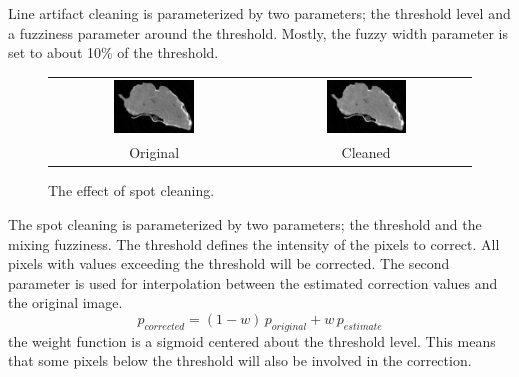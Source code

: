 \documentclass[a4paper]{scrreprt}
\begin{document}
Line artifact cleaning is parameterized by two parameters; the threshold level and a fuzziness parameter around the threshold. Mostly, the fuzzy width parameter is set to about 10\% of the threshold.
\begin{figure}[ht!]
\centering
\begin{tabular}{cc}
\includegraphics[width=0.4\textwidth]{figures/lineartifact_raw.png}&
\includegraphics[width=0.4\textwidth]{figures/lineartifact_clean.png}\\
Original & Cleaned
\end{tabular}
\caption{The effect of spot cleaning.}\label{fig_spotcleaning}
\end{figure}

The spot cleaning is parameterized by two parameters; the threshold and the mixing fuzziness. The threshold defines the intensity of the pixels to correct.
All pixels with values exceeding the threshold will be corrected. The second parameter is used for interpolation between the estimated correction values and the original image.
\[
p_{corrected}=(1-w)\,p_{original}+w\,p_{estimate}
\]
the weight function is a sigmoid centered about the threshold level. This means that some pixels below the threshold will also be involved in the correction.
\end{document}
